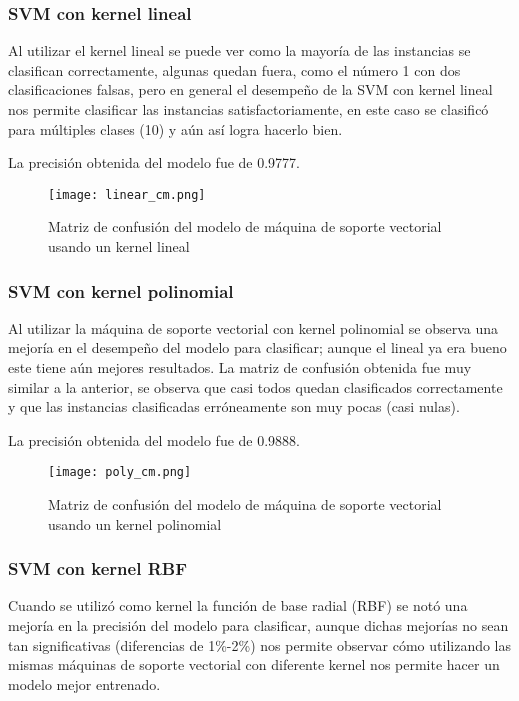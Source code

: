 \documentclass[sigconf,authorversion,nonacm]{acmart}
\begin{document}
\subsubsection{SVM con kernel lineal}
Al utilizar el kernel lineal se puede ver como la mayoría de las instancias se clasifican correctamente, algunas quedan fuera, como el número 1 con dos clasificaciones falsas, pero en general el desempeño de la SVM con kernel lineal nos permite clasificar las instancias satisfactoriamente, en este caso se clasificó para múltiples clases (10) y aún así logra hacerlo bien.

La precisión obtenida del modelo fue de 0.9777.

\begin{figure}[H]
  \centering
  \texttt{[image: linear\_cm.png]}
  \caption{Matriz de confusión del modelo de máquina de soporte vectorial usando un kernel lineal}
\end{figure}

\subsubsection{SVM con kernel polinomial}
Al utilizar la máquina de soporte vectorial con kernel polinomial se observa una mejoría en el desempeño del modelo para clasificar; aunque el lineal ya era bueno este tiene aún mejores resultados. La matriz de confusión obtenida fue muy similar a la anterior, se observa que casi todos quedan clasificados correctamente y que las instancias clasificadas erróneamente son muy pocas (casi nulas).

La precisión obtenida del modelo fue de 0.9888.

\begin{figure}[H]
  \centering
  \texttt{[image: poly\_cm.png]}
  \caption{Matriz de confusión del modelo de máquina de soporte vectorial usando un kernel polinomial}
\end{figure}

\subsubsection{SVM con kernel RBF}
Cuando se utilizó como kernel la función de base radial (RBF) se notó una mejoría en la precisión del modelo para clasificar, aunque dichas mejorías no sean tan significativas (diferencias de 1\%-2\%) nos permite observar cómo utilizando las mismas máquinas de soporte vectorial con diferente kernel nos permite hacer un modelo mejor entrenado.
\end{document}
